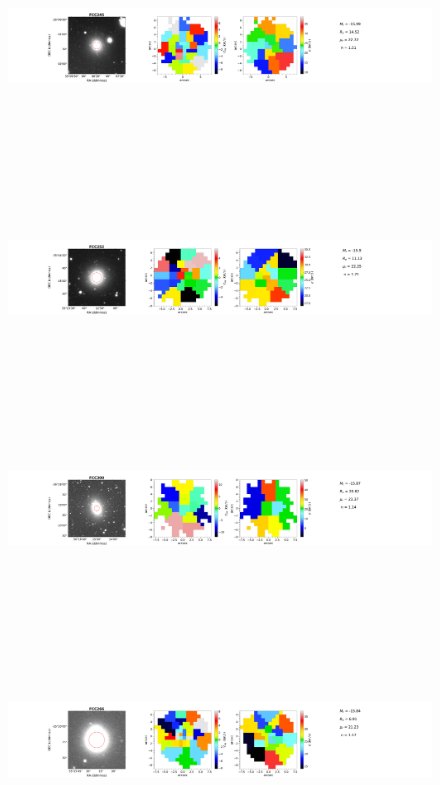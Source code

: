\documentclass{aa}
\begin{document}
\begin{figure}[!htb]
   \ContinuedFloat
   \centering
   \includegraphics[width=21cm,height=6cm,keepaspectratio]{../2_pipeline/1_V&S_Maps/245Velocity_map.pdf}
   \includegraphics[width=21cm,height=6cm,keepaspectratio]{../2_pipeline/1_V&S_Maps/252Velocity_map.pdf}
   \includegraphics[width=21cm,height=6cm,keepaspectratio]{../2_pipeline/1_V&S_Maps/300Velocity_map.pdf}
   \includegraphics[width=21cm,height=6cm,keepaspectratio]{../2_pipeline/1_V&S_Maps/266Velocity_map.pdf}

\end{figure}
\end{document}
